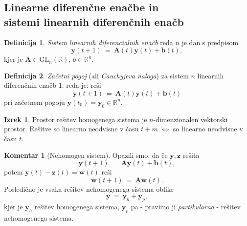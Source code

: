\documentclass[11pt]{article}
\newcommand{\R}{\mathbb{R}}
\renewcommand{\b}{\mathbf{b}}
\newcommand{\y}{\mathbf{y}}
\newcommand{\z}{\mathbf{z}}
\newcommand{\w}{\mathbf{w}}
\newcommand{\A}{\mathbf{A}}
\newcommand{\glnr}{\text{GL}_n(\R)}
\theoremstyle{definition}
\newtheorem{definicija}{Definicija}[section]
\theoremstyle{definition}
\theoremstyle{definition}
\newtheorem{izrek}{Izrek}[section]
\theoremstyle{definition}
\newtheorem*{komentar}{Komentar}
\begin{document}

\subsection{Linearne diferenčne enačbe in \\sistemi linearnih diferenčnih enačb}
\vspace{0.5cm}

\begin{definicija}

\textit{Sistem linearnih diferencialnih enačb} reda $n$ je dan s predpisom
$$\y(t+1) ~=~ \A(t)\y(t) + \b(t),$$
kjer je $\A \in \glnr$, $b \in \R^n$. 

\end{definicija}
\vspace{0.5cm}

\begin{definicija}

\textit{Začetni pogoj} (ali \textit{Cauchyjeva naloga}) za sistem $n$ linearnih diferenčnih enačb 1. reda je: reši 
$$\y(t+1) ~=~ \A(t)\y(t) + \b(t)$$
pri začetnem pogoju $\y(t_0) = \y_0 \in \R^n$.

\end{definicija}
\vspace{0.5cm}

\begin{izrek}

Prostor rešitev homogenega sistema je $n$-dimenzionalen vektorski prostor. Rešitve so linearno neodvisne v času $t+m$ $\iff$ so linearno neodvisne v času $t$.

\end{izrek}
\vspace{0.5cm}

\begin{komentar}[Nehomogen sistem]

Opazili smo, da če $\y,\z$ rešita
$$\y(t+1) ~=~ \A\y(t) + \b(t),$$
potem $\y(t) - \z(t) = \w(t)$ reši
$$\w(t+1) ~=~ \A\w(t).$$
Posledično je vsaka rešitev nehomogenega sistema oblike 
$$\y ~=~ \y_h + \y_p,$$
kjer je $\y_h$ rešitev homogenega sistema, $\y_p$ pa - pravimo ji \textit{partikularna} - rešitev nehomogenega sistema.

\end{komentar}
\vspace{0.5cm}
\end{document}
